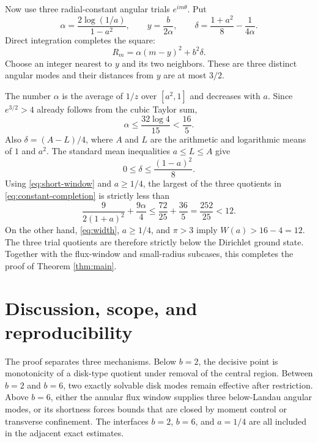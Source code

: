 \documentclass[11pt]{article}
\begin{document}
Now use three radial-constant angular trials $e^{im\theta}$.  Put
\begin{equation}\label{eq:alpha-delta}
 \alpha=\frac{2\log(1/a)}{1-a^2},\qquad
 y=\frac{b}{2\alpha},\qquad
 \delta=\frac{1+a^2}{8}-\frac{1}{4\alpha}.
\end{equation}
Direct integration completes the square:
\begin{equation}\label{eq:constant-completion}
       R_m=\alpha(m-y)^2+b^2\delta.
\end{equation}
Choose an integer nearest to $y$ and its two neighbors.  These are three
distinct angular modes and their distances from $y$ are at most $3/2$.

The number $\alpha$ is the average of $1/z$ over $[a^2,1]$ and decreases
with $a$.  Since $e^{3/2}>4$ already follows from the cubic Taylor sum,
\begin{equation}\label{eq:alpha-bound}
       \alpha\leq\frac{32\log4}{15}<\frac{16}{5}.
\end{equation}
Also $\delta=(A-L)/4$, where $A$ and $L$ are the arithmetic and logarithmic
means of $1$ and $a^2$.  The standard mean inequalities $a\leq L\leq A$
give
\begin{equation}\label{eq:delta-bound}
       0\leq\delta\leq\frac{(1-a)^2}{8}.
\end{equation}
Using \eqref{eq:short-window} and $a\geq1/4$, the largest of the three
quotients in \eqref{eq:constant-completion} is strictly less than
\begin{equation}\label{eq:thin-upper}
 \frac{9}{2(1+a)^2}+\frac{9\alpha}{4}
 \leq\frac{72}{25}+\frac{36}{5}
 =\frac{252}{25}<12.
\end{equation}
On the other hand, \eqref{eq:width}, $a\geq1/4$, and $\pi>3$ imply
$W(a)>16-4=12$.  The three trial quotients are therefore strictly below the
Dirichlet ground state.  Together with the flux-window and small-radius
subcases, this completes the proof of Theorem \ref{thm:main}.

\section{Discussion, scope, and reproducibility}\label{sec:discussion}

The proof separates three mechanisms.  Below $b=2$, the decisive point is
monotonicity of a disk-type quotient under removal of the central region.
Between $b=2$ and $b=6$, two exactly solvable disk modes remain effective
after restriction.  Above $b=6$, either the annular flux window supplies
three below-Landau angular modes, or its shortness forces bounds that are
closed by moment control or transverse confinement.  The interfaces
$b=2$, $b=6$, and $a=1/4$ are all included in the adjacent exact estimates.
\end{document}
